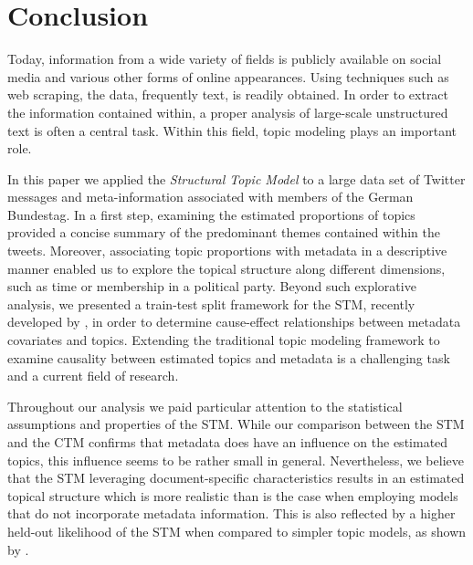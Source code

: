 \section{Conclusion}
\label{Conclusion}

Today, information from a wide variety of fields is publicly available on social media and various other forms of online appearances. Using techniques such as web scraping, the data, frequently text, is readily obtained. In order to extract the information contained within, a proper analysis of large-scale unstructured text is often a central task. Within this field, topic modeling plays an important role.

In this paper we applied the \textit{Structural Topic Model} to a large data set of Twitter messages and meta-information associated with members of the German Bundestag. In a first step, examining the estimated proportions of topics provided a concise summary of the predominant themes contained within the tweets. Moreover, associating topic proportions with metadata in a descriptive manner enabled us to explore the topical structure along different dimensions, such as time or membership in a political party. Beyond such explorative analysis, we presented a train-test split framework for the STM, recently developed by \cite{egami2018make}, in order to determine cause-effect relationships between metadata covariates and topics. Extending the traditional topic modeling framework to examine causality between estimated topics and metadata is a challenging task and a current field of research. 

Throughout our analysis we paid particular attention to the statistical assumptions and properties of the STM. While our comparison between the STM and the CTM confirms that metadata does have an influence on the estimated topics, this influence seems to be rather small in general. Nevertheless, we believe that the STM leveraging document-specific characteristics results in an estimated topical structure which is more realistic than is the case when employing models that do not incorporate metadata information. This is also reflected by a higher held-out likelihood of the STM when compared to simpler topic models, as shown by \cite{roberts2016model}. 

